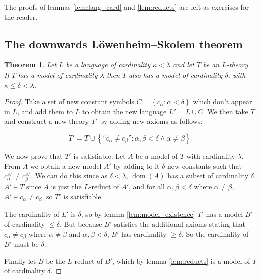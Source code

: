 \documentclass[10pt, a4paper, oneside]{article}
\newtheorem{thm}{Theorem}[section]
\theoremstyle{definition}
\theoremstyle{remark}
\theoremstyle{plain}
\theoremstyle{plain}
\DeclareMathOperator{\dom}{dom}
\begin{document}
The proofs of lemmas \ref{lem:lang_card} and \ref{lem:reducts} are left as
exercises for the reader.

\subsection{The downwards Löwenheim--Skolem theorem}

\begin{thm}
    Let $L$ be a language of cardinality $\kappa < \lambda$ and let $T$ be an
    $L$-theory. If $T$ has a model of cardinality $\lambda$ then $T$ also has a
    model of cardinality $\delta$, with $\kappa \leq \delta < \lambda$.
\end{thm}

\begin{proof}
    Take a set of new constant symbols $C = \left\{ c_\alpha : \alpha < \delta
    \right\}$ which don't appear in $L$, and add them to $L$ to obtain the new
    language $L' = L \cup C$. We then take $T$ and construct a new theory $T'$
    by adding new axioms as follows:
    
    \begin{equation}
        T' = T \cup \left\{
            \text{``$c_\alpha \neq c_\beta$''}
            :
            \alpha, \beta < \delta \wedge \alpha \neq \beta
        \right\}.
    \end{equation}
    
    We now prove that $T'$ is satisfiable. Let $A$ be a model of $T$ with
    cardinality $\lambda$. From $A$ we obtain a new model $A'$ by adding to it
    $\delta$ new constants such that $c_\alpha^{A'} \neq c_\beta^{A'}$. We can
    do this since as $\delta < \lambda$, $\dom(A)$ has a subset of cardinality
    $\delta$. $A' \models T$ since $A$ is just the $L$-reduct of $A'$, and for
    all $\alpha, \beta < \delta$ where $\alpha \neq \beta$,
    $A' \models c_\alpha \neq c_\beta$, so $T'$ is satisfiable.
    
    The cardinality of $L'$ is $\delta$, so by lemma \ref{lem:model_existence}
    $T'$ has a model $B'$ of cardinality $\leq \delta$. But because $B'$
    satisfies the additional axioms stating that $c_\alpha \neq c_\beta$ where
    $\alpha \neq \beta$ and $\alpha, \beta < \delta$, $B'$ has cardinality
    $\geq \delta$. So the cardinality of $B'$ must be $\delta$.
    
    Finally let $B$ be the $L$-reduct of $B'$, which by lemma \ref{lem:reducts}
    is a model of $T$ of cardinality $\delta$.
\end{proof}
\end{document}
